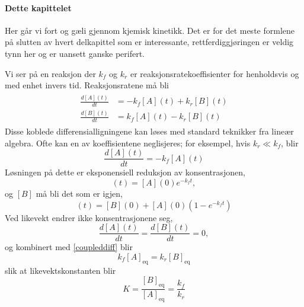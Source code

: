 \paragraph{Dette kapittelet} Her går vi fort og gæli gjennom kjemisk kinetikk. Det er for det meste formlene på slutten av hvert delkapittel som er interessante, rettferdiggjøringen er veldig tynn her og er uansett ganske perifert.

\noindent Vi ser på en reaksjon  der $k_f$ og $k_r$ er reaksjonsratekoeffisienter for henholdsvis  og  med enhet invers tid. Reaksjonsratene må bli
\begin{align}
\begin{split}
	\label{coupleddiff}
	\frac{d[A](t)}{dt} &= -k_f[A](t) + k_r[B](t) \\
	\frac{d[B](t)}{dt} &= k_f[A](t) - k_r[B](t)
\end{split}
\end{align}
Disse koblede differensialligningene kan løses med standard teknikker fra lineær algebra. Ofte kan en av koeffisientene neglisjeres; for eksempel, hvis $k_r\ll k_f$, blir
\begin{equation}
	\frac{d[A](t)}{dt}=-k_f[A](t)
\end{equation}
Løsningen på dette er eksponensiell reduksjon av konsentrasjonen,
\begin{equation}
	[A](t)=[A](0)e^{-k_ft},
\end{equation}
og $[B]$ må bli det som er igjen,
\begin{equation}
	[B](t)=[B](0)+[A](0)(1-e^{-k_ft})
\end{equation}
Ved likevekt endrer ikke konsentrasjonene seg,
\begin{equation}
	\frac{d[A](t)}{dt}=\frac{d[B](t)}{dt}=0,
\end{equation}
og kombinert med \eqref{coupleddiff} blir
\begin{equation}
	k_f[A]_{\text{eq}}=k_r[B]_{\text{eq}}
\end{equation}
slik at likevektskonstanten blir
\begin{equation}
	K = \frac{[B]_{\text{eq}}}{[A]_{\text{eq}}} = \frac{k_f}{k_r}
\end{equation}

